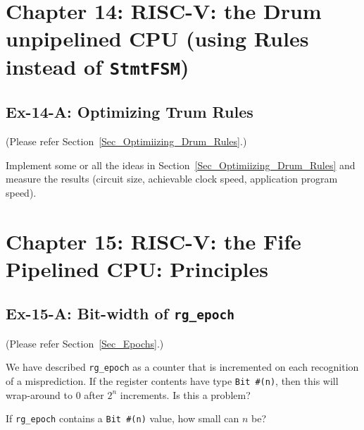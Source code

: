 
\hdivider

\section*{Chapter 14: RISC-V: the Drum unpipelined CPU (using Rules instead of {\tt StmtFSM})}


\subsection*{Ex-14-A: Optimizing Trum Rules}
\label{Ex-14-A-Optimizing-Drum-Rules}

(Please refer Section~\ref{Sec_Optimiizing_Drum_Rules}.)

Implement some or all the ideas in
Section~\ref{Sec_Optimiizing_Drum_Rules} and measure the results
(circuit size, achievable clock speed, application program speed).



\hdivider

\section*{Chapter 15: RISC-V: the Fife Pipelined CPU: Principles}


\subsection*{Ex-15-A: Bit-width of {\tt rg\_epoch}}
\label{Ex-15-A-Epoch-Bitwidth}

(Please refer Section~\ref{Sec_Epochs}.)

We have described \verb|rg_epoch| as a counter that is incremented on
each recognition of a misprediction.  If the register contents have
type \verb|Bit #(n)|, then this will wrap-around to 0 after $2^n$
increments.  Is this a problem?

If \verb|rg_epoch| contains a \verb|Bit #(n)| value, how small can $n$ be?


